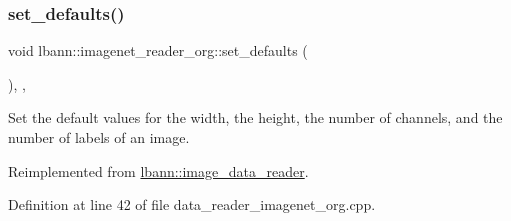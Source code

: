 \mbox{\label{classlbann_1_1imagenet__reader__org_af0d9fc9081013ef0ddd3222dfd9abb8b}} 
\subsubsection{\texorpdfstring{set\+\_\+defaults()}{set\_defaults()}}
{\footnotesize\ttfamily void lbann\+::imagenet\+\_\+reader\+\_\+org\+::set\+\_\+defaults (\begin{DoxyParamCaption}{ }\end{DoxyParamCaption})\hspace{0.3cm}{\ttfamily [override]}, {\ttfamily [protected]}, {\ttfamily [virtual]}}



Set the default values for the width, the height, the number of channels, and the number of labels of an image. 



Reimplemented from \hyperlink{classlbann_1_1image__data__reader_a8e9dbeaa0239d56597455cc23787a21d}{lbann\+::image\+\_\+data\+\_\+reader}.



Definition at line 42 of file data\+\_\+reader\+\_\+imagenet\+\_\+org.\+cpp.


